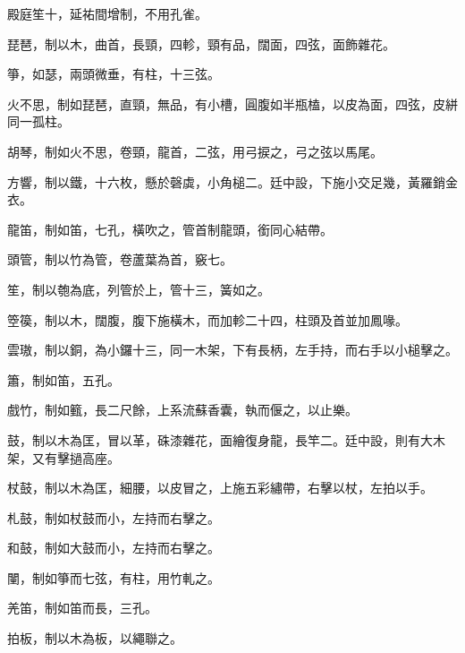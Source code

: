 \begin{pinyinscope}
 殿庭笙十，延祐間增制，不用孔雀。



 琵琶，制以木，曲首，長頸，四軫，頸有品，闊面，四弦，面飾雜花。



 箏，如瑟，兩頭微垂，有柱，十三弦。



 火不思，制如琵琶，直頸，無品，有小槽，圓腹如半瓶榼，以皮為面，四弦，皮絣同一孤柱。



 胡琴，制如火不思，卷頸，龍首，二弦，用弓捩之，弓之弦以馬尾。



 方響，制以鐵，十六枚，懸於磬虡，小角槌二。廷中設，下施小交足幾，黃羅銷金衣。



 龍笛，制如笛，七孔，橫吹之，管首制龍頭，銜同心結帶。



 頭管，制以竹為管，卷蘆葉為首，竅七。



 笙，制以匏為底，列管於上，管十三，簧如之。



 箜篌，制以木，闊腹，腹下施橫木，而加軫二十四，柱頭及首並加鳳喙。



 雲璈，制以銅，為小鑼十三，同一木架，下有長柄，左手持，而右手以小槌擊之。



 簫，制如笛，五孔。



 戲竹，制如籈，長二尺餘，上系流蘇香囊，執而偃之，以止樂。



 鼓，制以木為匡，冒以革，硃漆雜花，面繪復身龍，長竿二。廷中設，則有大木架，又有擊撾高座。



 杖鼓，制以木為匡，細腰，以皮冒之，上施五彩繡帶，右擊以杖，左拍以手。



 札鼓，制如杖鼓而小，左持而右擊之。



 和鼓，制如大鼓而小，左持而右擊之。



 闉，制如箏而七弦，有柱，用竹軋之。



 羌笛，制如笛而長，三孔。



 拍板，制以木為板，以繩聯之。




\end{pinyinscope}
